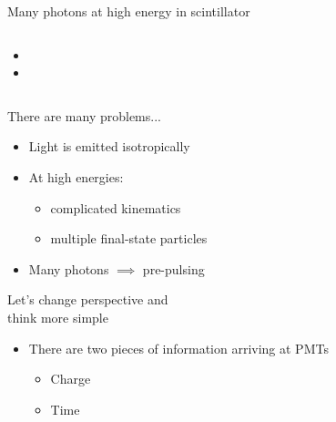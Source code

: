 \documentclass[14pt]{beamer}
\begin{document}
\begin{frame}{Many photons at high energy in scintillator}
\begin{columns}[T]
\begin{block}{}
			\vspace{-20mm}
			\begin{itemize}
				\item<3-> {\fontsize{10pt}{10pt}\selectfont{Fitters must to be
					robust against these statistical outliers}}
				\item<4-> {\fontsize{10pt}{10pt}}
			\end{itemize}
		\end{block}
	\end{columns}
\end{frame}

\begin{frame}{There are many problems...}
	\begin{itemize}
		\item<1-> Light is emitted isotropically
		\item<2-> At high energies:
		\begin{itemize}
			\item<3-> complicated kinematics
			\item<3-> multiple final-state particles
		\end{itemize}
		\item<4-> Many photons $\implies$ pre-pulsing
	\end{itemize}
\end{frame}

\begin{frame}{Let's change perspective and\\think more simple}
	\begin{itemize}
		\item<2-> There are two pieces of information arriving at PMTs
		\begin{itemize}
			\item<3-> {\color{magenta}Charge}
			\item<3-> {\color{blue}Time}
		\end{itemize}
	\end{itemize}
\end{frame}
\end{document}
